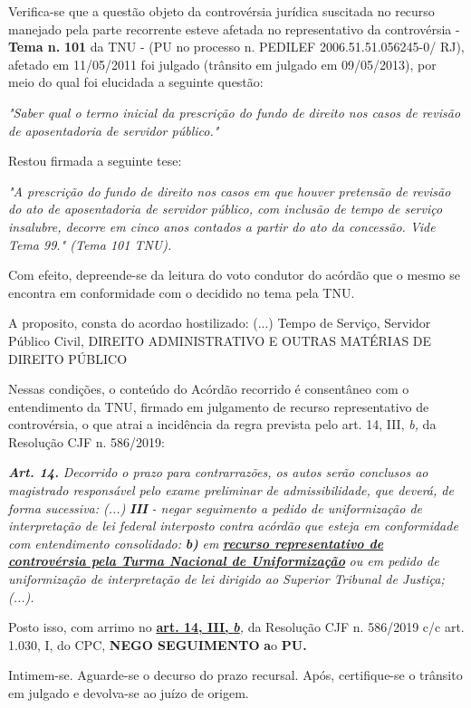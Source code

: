 \documentclass[12pt]{article}
\begin{document}
\justifying
\noindent Verifica-se que a questão objeto da controvérsia jurídica suscitada no recurso manejado pela parte recorrente esteve afetada no representativo da controvérsia - \textbf{Tema n. }\textbf{101} da TNU - (PU no processo n. PEDILEF 2006.51.51.056245-0/ RJ),  afetado em 11/05/2011 foi julgado (trânsito em julgado em 09/05/2013), por meio do qual foi elucidada a seguinte questão:

\noindent \textit{"Saber qual o termo inicial da prescrição do fundo de direito nos casos de revisão de aposentadoria de servidor público."}

\noindent Restou firmada a seguinte tese:

\noindent \textit{"A prescrição do fundo de direito nos casos em que houver pretensão de revisão do ato de aposentadoria de servidor público, com inclusão de tempo de serviço insalubre, decorre em cinco anos contados a partir do ato da concessão. Vide Tema 99." (Tema 101 TNU).}

\noindent Com efeito, depreende-se da leitura do voto condutor do acórdão que o mesmo se encontra em conformidade com o decidido no  tema pela TNU.

\noindent A proposito, consta do acordao hostilizado: (...) Tempo de Serviço, Servidor Público Civil, DIREITO ADMINISTRATIVO E OUTRAS MATÉRIAS DE DIREITO PÚBLICO

\noindent Nessas condições, o conteúdo do Acórdão recorrido é consentâneo com o entendimento da TNU, firmado em julgamento de recurso representativo de controvérsia, o que atrai a incidência da regra prevista pelo art. 14, III, \textit{b,} da Resolução CJF n. 586/2019:

\noindent \textit{\textbf{Art. 14.}}\textit{ Decorrido o prazo para contrarrazões, os autos serão conclusos ao magistrado responsável pelo exame preliminar de admissibilidade, que deverá, de forma sucessiva: (...) }\textit{\textbf{III }}\textit{- negar seguimento a pedido de uniformização de interpretação de lei federal interposto contra acórdão que esteja em conformidade com entendimento consolidado: }\textit{\textbf{b)}}\textit{ em }\uline{\textit{\textbf{recurso representativo de controvérsia pela Turma Nacional de Uniformização}}}\textit{ ou em pedido de uniformização de interpretação de lei dirigido ao Superior Tribunal de Justiça;(...).}

\noindent Posto isso, com arrimo no \uline{\textbf{art. 14, III, }}\uline{\textit{\textbf{b}}}\textit{,} da Resolução CJF n. 586/2019 c/c art. 1.030, I, do CPC, \textbf{NEGO SEGUIMENTO }\textbf{a}o\textbf{ PU}\textbf{.}

\noindent Intimem-se. Aguarde-se o decurso do prazo recursal. Após, certifique-se o trânsito em julgado e devolva-se ao juízo de origem.
\end{document}
